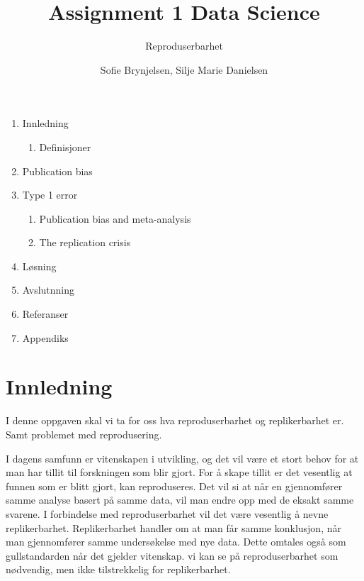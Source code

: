 \documentclass[
  12pt,
]{article}
\title{Assignment 1 Data Science}
\subtitle{Reproduserbarhet}
\author{Sofie Brynjelsen, Silje Marie Danielsen}
\date{}
\providecommand{\tightlist}{%
  \setlength{\itemsep}{0pt}\setlength{\parskip}{0pt}}
\begin{document}
\maketitle

\newpage

\begin{enumerate}
\def\labelenumi{\arabic{enumi})}
\tightlist
\item
  Innledning

  \begin{enumerate}
  \def\labelenumii{\arabic{enumii})}
  \setcounter{enumii}{1}
  \tightlist
  \item
    Definisjoner
  \end{enumerate}
\item
  Publication bias
\item
  Type 1 error

  \begin{enumerate}
  \def\labelenumii{\arabic{enumii})}
  \setcounter{enumii}{1}
  \tightlist
  \item
    Publication bias and meta-analysis
  \item
    The replication crisis
  \end{enumerate}
\item
  Løsning
\item
  Avslutnning
\item
  Referanser
\item
  Appendiks
\end{enumerate}

\hypertarget{innledning}{%
\section{Innledning}\label{innledning}}

I denne oppgaven skal vi ta for oss hva reproduserbarhet og
replikerbarhet er. Samt problemet med reprodusering.

I dagens samfunn er vitenskapen i utvikling, og det vil være et stort
behov for at man har tillit til forskningen som blir gjort. For å skape
tillit er det vesentlig at funnen som er blitt gjort, kan reproduseres.
Det vil si at når en gjennomfører samme analyse basert på samme data,
vil man endre opp med de eksakt samme svarene. I forbindelse med
reproduserbarhet vil det være vesentlig å nevne replikerbarhet.
Replikerbarhet handler om at man får samme konklusjon, når man
gjennomfører samme undersøkelse med nye data. Dette omtales også som
gullstandarden når det gjelder vitenskap. vi kan se på reproduserbarhet
som nødvendig, men ikke tilstrekkelig for replikerbarhet.
\end{document}
